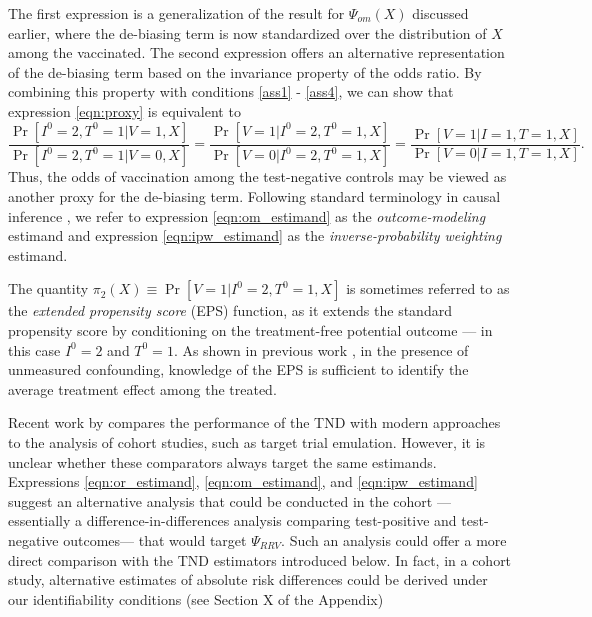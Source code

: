 \documentclass[11pt]{article}
\begin{document}
The first expression is a generalization of the result for $\Psi_{om}(X)$ discussed earlier, where the de-biasing term is now standardized over the distribution of $X$ among the vaccinated. The second expression offers an alternative representation of the de-biasing term based on the invariance property of the odds ratio. By combining this property with conditions \ref{ass1} - \ref{ass4}, we can show that expression \ref{eqn:proxy} is equivalent to
$$\frac{\Pr[I^0 = 2,  T^0 = 1| V = 1, X]}{\Pr[I^0 = 2,  T^0 = 1 | V = 0, X]} = \frac{\Pr[V = 1 | I^0 = 2, T^0 = 1, X]}{\Pr[V = 0 | I^0 = 2, T^0 = 1, X]} =\frac{\Pr[V = 1 | I = 1, T = 1, X]}{\Pr[V = 0 | I = 1, T = 1, X]}.$$
Thus, the odds of vaccination among the test-negative controls may be viewed as another proxy for the de-biasing term. Following standard terminology in causal inference \cite{robins_estimating_1992}, we refer to expression \ref{eqn:om_estimand} as the \textit{outcome-modeling} estimand and expression \ref{eqn:ipw_estimand} as the \textit{inverse-probability weighting} estimand.

\begin{remark}
The quantity $\pi_2(X) \equiv \Pr[V = 1 | I^0 = 2, T^0 = 1, X]$ is sometimes referred to as the \textit{extended propensity score} (EPS) function, as it extends the standard propensity score by conditioning on the treatment-free potential outcome --- in this case $I^0 = 2$ and $T^0 = 1$. As shown in previous work \cite{tchetgen_single_2023}, in the presence of unmeasured confounding, knowledge of the EPS is sufficient to identify the average treatment effect among the treated. 
\end{remark}

\begin{remark}
Recent work by \textcite{li2024comparison} compares the performance of the TND with modern approaches to the analysis of cohort studies, such as target trial emulation. However, it is unclear whether these comparators always target the same estimands. Expressions \ref{eqn:or_estimand}, \ref{eqn:om_estimand}, and \ref{eqn:ipw_estimand} suggest an alternative analysis that could be conducted in the cohort ---essentially a difference-in-differences analysis comparing test-positive and test-negative outcomes--- that would target $\Psi_{RRV}$. Such an analysis could offer a more direct comparison with the TND estimators introduced below. In fact, in a cohort study, alternative estimates of absolute risk differences could be derived under our identifiability conditions (see Section X of the Appendix)
\end{remark}
\end{document}
